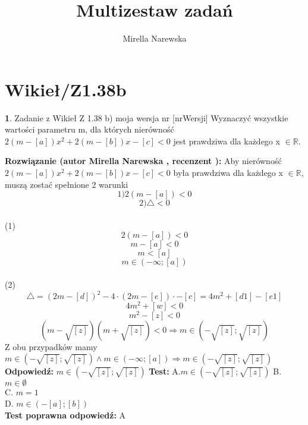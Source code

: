 \documentclass[12pt, a4paper]{article}
\title{Multizestaw zadań}
\author{Mirella Narewska}
\date{}
\theoremstyle{definition} %
\newtheorem{zad}{}
\newcommand{\kategoria}[1]{\section{#1}} %
\newcommand{\zadStart}[1]{\begin{zad}#1\newline} %
\newcommand{\zadStop}{\end{zad}}   %
\newcommand{\rozwStart}[2]{\noindent \textbf{Rozwiązanie (autor #1 , recenzent #2): }\newline} %
\newcommand{\odpStart}{\noindent \textbf{Odpowiedź:}\newline}    %
\newcommand{\odpStop}{\newline}                                             %
\newcommand{\testStart}{\noindent \textbf{Test:}\newline} %
\newcommand{\testStop}{\newline} %
\newcommand{\kluczStart}{\noindent \textbf{Test poprawna odpowiedź:}\newline} %
\newcommand{\kluczStop}{\newline} %
\begin{document}
\maketitle


\kategoria{Wikieł/Z1.38b}
\zadStart{Zadanie z Wikieł Z 1.38 b) moja wersja nr [nrWersji]}
Wyznaczyć wszystkie wartości parametru m, dla których nierówność $2(m-[a])x^2+2(m-[b])x-[c]<0$ jest prawdziwa dla każdego x $\in \mathbb{R}.$
\zadStop
\rozwStart{Mirella Narewska}{}
Aby nierówność $2(m-[a])x^2+2(m-[b])x-[c]<0$ była prawdziwa dla każdego  x $\in \mathbb{R}$, muszą zostać spełnione 2 warunki
$$1) 2(m-[a])<0$$
$$2)  \triangle<0$$
\\
(1)
\\
$$2(m-[a])<0$$
$$m-[a]<0$$
$$m<[a]$$
$$m \in (-\infty;[a])$$
\\
(2)
\\
$$\triangle=(2m-[d])^2-4\cdot(2m-[e])\cdot-[c]=4m^2+[d1]-[e1]$$
$$4m^2+[w]<0$$
$$m^2-[z]<0$$
$$(m-\sqrt{[z]})(m+\sqrt{[z]})<0 \Rightarrow m \in (-\sqrt{[z]};\sqrt{[z]})$$
Z obu przypadków mamy $m \in (-\sqrt{[z]};\sqrt{[z]}) \wedge  m \in (-\infty;[a]) \Rightarrow m \in (-\sqrt{[z]};\sqrt{[z]})$
\odpStart
$m \in (-\sqrt{[z]};\sqrt{[z]})$
\odpStop
\testStart
A.$m \in (-\sqrt{[z]};\sqrt{[z]})$
B. $m \in \emptyset$ \\
C. $m=1$ \\
D. $m \in (-[a];[b])$ \\
\testStop
\kluczStart
A
\kluczStop
\end{document}
